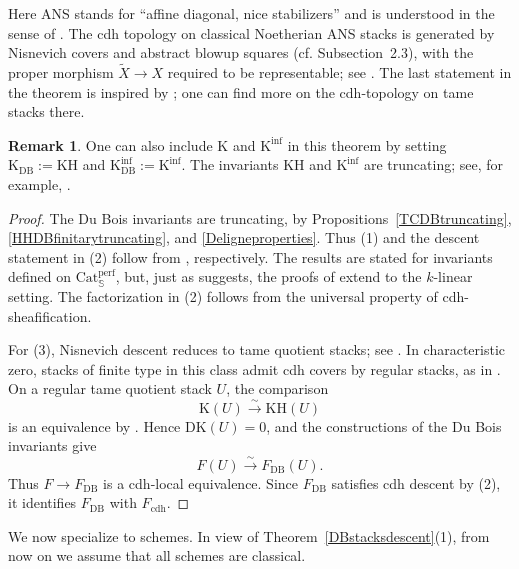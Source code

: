 \documentclass{amsart}
\theoremstyle{plain}
\theoremstyle{definition}
\newtheorem{remark}[prop]{Remark}
\newcommand{\bbS}{\mathbb{S}}
\newcommand{\Catperf}{\mathrm{Cat}^{\mathrm{perf}}}
\newcommand{\K}{\mathrm{K}}
\newcommand{\KH}{\mathrm{KH}}
\newcommand{\DK}{\mathrm{DK}}
\newcommand{\DB}{\mathrm{DB}}
\newcommand{\cdh}{\mathrm{cdh}}
\begin{document}
Here ANS stands for ``affine diagonal, nice stabilizers''
and is understood in the sense of
\cite[Section~5.2]{ES21}.
The cdh topology on classical Noetherian ANS stacks is generated by Nisnevich covers and abstract blowup squares (cf. Subsection~2.3), with the proper morphism $\widetilde X\to X$ required to be representable; see \cite[Section~5.2]{ES21}. The last statement in the theorem is inspired by \cite{Hoy20}; one can find more on the cdh-topology on tame stacks there.

\begin{remark}
One can also include $\K$ and $\K^{\inf}$ in this theorem by setting $\K_{\DB}:=\KH$ and $\K^{\inf}_{\DB}:=\K^{\inf}$. The invariants $\KH$ and $\K^{\inf}$ are truncating; see, for example, \cite[Example~5.2.7]{ES21}.
\end{remark}

\begin{proof}
The Du Bois invariants are truncating, by Propositions~\ref{TCDBtruncating},
\ref{HHDBfinitarytruncating}, and
\ref{Deligneproperties}.
Thus (1) and the descent statement in (2) follow from
\cite[Corollaries~5.2.3 and~5.2.6]{ES21}, respectively. The results are stated for invariants defined on $\Catperf_\bbS$, but, just as \cite[Remark 5.1.4]{ES21} suggests, the proofs of \cite{ES21}
extend to the $k$-linear setting.
The factorization in (2) follows from the universal property of cdh-sheafification.

For (3), Nisnevich
descent reduces to tame quotient stacks; see \cite[Section~5.2, especially (5.2.1)]{ES21}.
In characteristic zero, stacks of finite type in this class admit cdh covers by regular stacks, as in
\cite[Corollary~1.4]{Hoy20}.
On a regular tame quotient stack $U$, the comparison
\[
\K(U)\xrightarrow{\sim}\KH(U)
\]
is an equivalence by \cite[Theorem~1.3]{Hoy20}.
Hence $\DK(U)=0$, and the constructions of the Du Bois invariants give
\[
F(U)\xrightarrow{\sim}F_{\DB}(U).
\]
Thus $F\to F_{\DB}$ is a cdh-local equivalence. Since $F_{\DB}$ satisfies cdh descent by (2), it identifies $F_{\DB}$ with $F_{\cdh}$.
\end{proof}

\medskip

We now specialize to schemes. In view of Theorem~\ref{DBstacksdescent}(1), from now on we assume that all schemes are classical.
\end{document}
